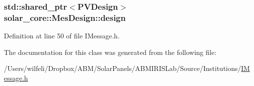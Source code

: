 \subsubsection[{design}]{\setlength{\rightskip}{0pt plus 5cm}std\+::shared\+\_\+ptr$<${\bf P\+V\+Design}$>$ solar\+\_\+core\+::\+Mes\+Design\+::design}\label{classsolar__core_1_1_mes_design_a85bd3d4d32c763ac3f9c6547ab4002ab}


Definition at line 50 of file I\+Message.\+h.



The documentation for this class was generated from the following file\+:\begin{DoxyCompactItemize}
\item 
/\+Users/wilfeli/\+Dropbox/\+A\+B\+M/\+Solar\+Panels/\+A\+B\+M\+I\+R\+I\+S\+Lab/\+Source/\+Institutions/\hyperlink{_i_message_8h}{I\+Message.\+h}\end{DoxyCompactItemize}
